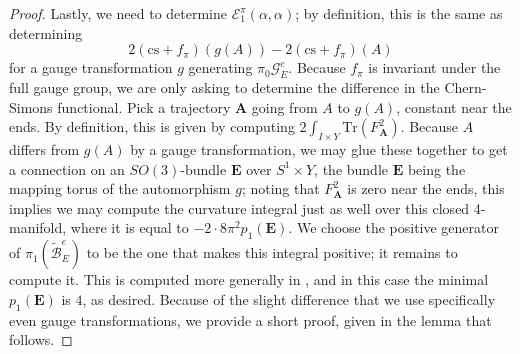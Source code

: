 \documentclass{memo-l}
\theoremstyle{definition}
\theoremstyle{remark}
\numberwithin{section}{chapter}
\numberwithin{equation}{chapter}
\begin{document}
\begin{proof}
Lastly, we need to determine $\mathcal E^\pi_1(\alpha, \alpha)$; by definition, this is the same as determining 
$$2(\text{cs}+f_\pi)(g(A)) - 2(\text{cs}+f_\pi)(A)$$ 
for a gauge transformation $g$ generating $\pi_0 \mathcal G^e_E$. Because $f_\pi$ is invariant under the full gauge group, we are only asking to determine the difference in the Chern-Simons functional. Pick a trajectory $\mathbf{A}$ going from $A$ to $g(A)$, constant near the ends. 
By definition, this is given by computing $2\int_{I \times Y} \text{Tr}(F_{\mathbf{A}}^2)$. Because $A$ differs from $g(A)$ by a gauge transformation, we may glue these together to get a connection on an $SO(3)$-bundle $\mathbf{E}$ over $S^1 \times Y$, the bundle $\mathbf{E}$ being the mapping torus of the automorphism $g$; noting that $F_{\mathbf{A}}^2$ is zero near the ends, this implies we may compute the curvature integral just as well over this closed 4-manifold, where it is equal to $-2 \cdot 8\pi^2 p_1(\mathbf{E})$. We choose the positive generator of $\pi_1(\widetilde{\mathcal B}^e_E)$ to be the one that makes this integral positive; it remains to compute it. This is computed more generally in \cite[Equation~(24)]{KM1}, and in this case the minimal $p_1(\mathbf{E})$ is $4$, as desired. Because of the slight difference that we use specifically even gauge transformations, we provide a short proof, given in the lemma that follows. 
\end{proof}
\end{document}
